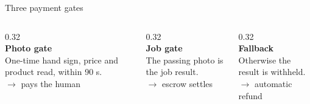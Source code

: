 \begin{frame}{Three payment gates}
  \begin{columns}[T]
    \begin{column}{0.32\textwidth}\centering
      {}\\[0.4em]{\large\bfseries Photo gate}\\
      One-time hand sign, price and product read, within 90 s.\\[0.4em]
      $\rightarrow$ \alert{pays the human}
    \end{column}
    \begin{column}{0.32\textwidth}\centering
      {}\\[0.4em]{\large\bfseries Job gate}\\
      The passing photo is the job result.\\[0.4em]
      $\rightarrow$ \alert{escrow settles}
    \end{column}
    \begin{column}{0.32\textwidth}\centering
      {}\\[0.4em]{\large\bfseries Fallback}\\
      Otherwise the result is withheld.\\[0.4em]
      $\rightarrow$ \alert{automatic refund}
    \end{column}
  \end{columns}
\end{frame}
